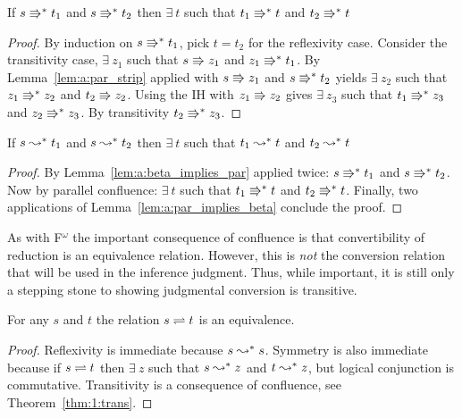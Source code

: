 \begin{lemma}
    \label{lem:a:par_confluence}
    If $s \Rrightarrow^* t_1$ and $s \Rrightarrow^* t_2$ then $\exists\ t$ such that $t_1 \Rrightarrow^* t$ and $t_2 \Rrightarrow^* t$
\end{lemma}
\begin{proof}
    By induction on $s \Rrightarrow^* t_1$, pick $t = t_2$ for the reflexivity case.
    Consider the transitivity case, $\exists\ z_1$ such that $s \Rrightarrow z_1$ and $z_1 \Rrightarrow^* t_1$.
    By Lemma~\ref{lem:a:par_strip} applied with $s \Rrightarrow z_1$ and $s \Rrightarrow^* t_2$ yields $\exists\ z_2$ such that $z_1 \Rrightarrow^* z_2$ and $t_2 \Rrightarrow z_2$.
    Using the IH with $z_1 \Rrightarrow z_2$ gives $\exists\ z_3$ such that $t_1 \Rrightarrow^* z_3$ and $z_2 \Rrightarrow^* z_3$.
    By transitivity $t_2 \Rrightarrow^* z_3$.
\end{proof}

\begin{lemma}[Confluence]
    \label{lem:2:confluence}
    If $s \leadsto^* t_1$ and $s \leadsto^* t_2$ then $\exists\ t$ such that $t_1 \leadsto^* t$ and $t_2 \leadsto^* t$
\end{lemma}
\begin{proof}
    By Lemma~\ref{lem:a:beta_implies_par} applied twice: $s \Rrightarrow^* t_1$ and $s \Rrightarrow^* t_2$.
    Now by parallel confluence: $\exists\ t$ such that $t_1 \Rrightarrow^* t$ and $t_2 \Rrightarrow^* t$.
    Finally, two applications of Lemma~\ref{lem:a:par_implies_beta} conclude the proof.
\end{proof}

As with F$^\omega$ the important consequence of confluence is that convertibility of reduction is an equivalence relation.
However, this is \textit{not} the conversion relation that will be used in the inference judgment.
Thus, while important, it is still only a stepping stone to showing judgmental conversion is transitive.

\begin{theorem}
    \label{lem:2:beta_conv_equivalence}
    For any $s$ and $t$ the relation $s \rightleftharpoons t$ is an equivalence.
\end{theorem}
\begin{proof}
    Reflexivity is immediate because $s \leadsto^* s$.
    Symmetry is also immediate because if $s \rightleftharpoons t$ then $\exists\ z$ such that $s \leadsto^* z$ and $t \leadsto^* z$, but logical conjunction is commutative.
    Transitivity is a consequence of confluence, see Theorem~\ref{thm:1:trans}.
\end{proof}

